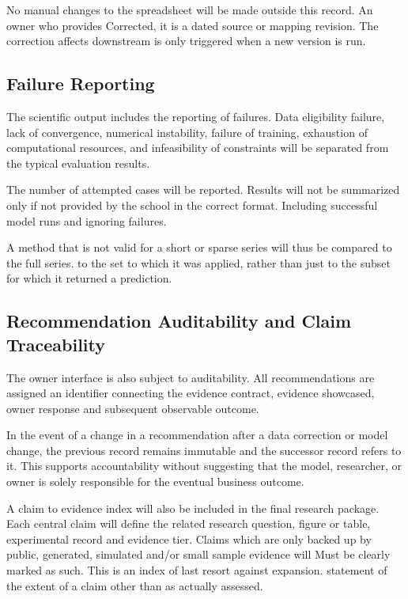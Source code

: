\documentclass[a4paper,11pt,oneside]{book}
\theoremstyle{plain}
\theoremstyle{definition}
\theoremstyle{remark}
\begin{document}
No manual changes to the spreadsheet will be made outside this record. An owner who provides Corrected, it is a dated source or mapping revision. The correction affects downstream is only triggered when a new version is run.

\subsection{Failure Reporting}
\label{subsec:failure_reporting}

The scientific output includes the reporting of failures. Data eligibility failure, lack of convergence, numerical instability, failure of training, exhaustion of computational resources, and infeasibility of constraints will be separated from the typical evaluation results.

The number of attempted cases will be reported. Results will not be summarized only if not provided by the school in the correct format. Including successful model runs and ignoring failures.

A method that is not valid for a short or sparse series will thus be compared to the full series. to the set to which it was applied, rather than just to the subset for which it returned a prediction.

\subsection{Recommendation Auditability and Claim Traceability}
\label{subsec:claim_traceability}

The owner interface is also subject to auditability. All recommendations are assigned an identifier connecting the evidence contract, evidence showcased, owner response and subsequent observable outcome.

In the event of a change in a recommendation after a data correction or model change, the previous record remains immutable and the successor record refers to it. This supports accountability without suggesting that the model, researcher, or owner is solely responsible for the eventual business outcome.

A claim to evidence index will also be included in the final research package. Each central claim will define the related research question, figure or table, experimental record and evidence tier. Claims which are only backed up by public, generated, simulated and/or small sample evidence will Must be clearly marked as such. This is an index of last resort against expansion. statement of the extent of a claim other than as actually assessed.
\end{document}
